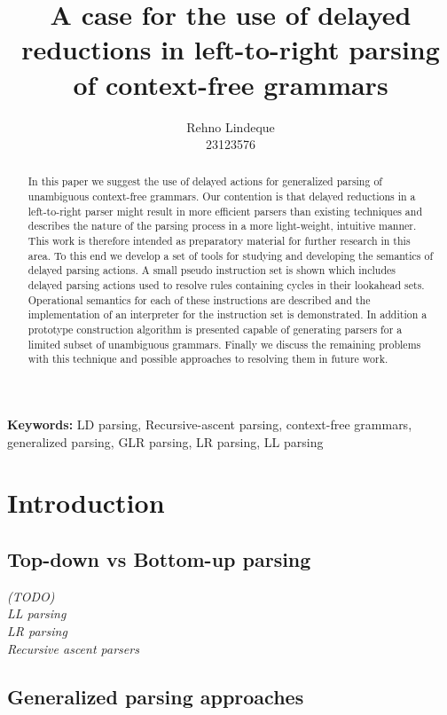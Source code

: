 \documentclass[11pt]{article}
\begin{document}
\title{A case for the use of delayed reductions in left-to-right parsing of context-free grammars}
\author{Rehno Lindeque
\\23123576}

\maketitle

\begin{abstract}
In this paper we suggest the use of delayed actions for generalized parsing of unambiguous context-free grammars. 
Our contention is that delayed reductions in a left-to-right parser might result in more efficient parsers than existing techniques 
and describes the nature of the parsing process in a more light-weight, intuitive manner.
This work is therefore intended as preparatory material for further research in this area.
To this end we develop a set of tools for studying and developing the semantics of delayed parsing actions.
A small pseudo instruction set is shown which includes delayed parsing actions used to resolve rules containing cycles in their lookahead sets.
Operational semantics for each of these instructions are described and the implementation of an interpreter for the instruction set is demonstrated.
In addition a prototype construction algorithm is presented capable of generating parsers for a limited subset of unambiguous grammars.
Finally we discuss the remaining problems with this technique and possible approaches to resolving them in future work.\\
\end{abstract}

\textbf{Keywords:} LD parsing, Recursive-ascent parsing, context-free grammars, generalized parsing, GLR parsing, LR parsing, LL parsing

\section{Introduction}

\subsection{Top-down vs Bottom-up parsing}
\emph{(TODO)\\ %
LL parsing\\
LR parsing \cite{knuth65}\\
Recursive ascent parsers \cite{13326, 47909, 770849} }

\subsection{Generalized parsing approaches}
\end{document}
